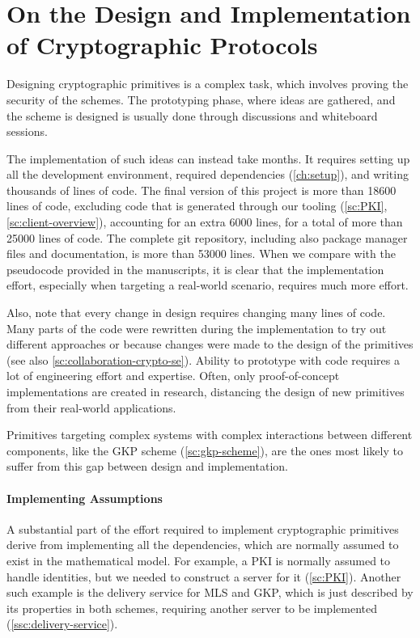 \section{On the Design and Implementation of Cryptographic Protocols}\label{sc:gap-crypto-primitives-design-implementation}

Designing cryptographic primitives is a complex task,
which involves proving the security of the schemes. 
The prototyping phase, where ideas are gathered, 
and the scheme is designed is usually done through 
discussions and whiteboard sessions.

The implementation of such ideas can instead take months.
It requires setting up all the development environment,
required dependencies (\cref{ch:setup}), and writing thousands of lines of code.
The final version of this project 
is more than 18600 lines of code, excluding code that
is generated through our tooling (\cref{sc:PKI}, \cref{sc:client-overview}), 
accounting for an extra 6000 lines,
for a total of more than 25000 lines of code.
The complete git repository, including
also package manager files and documentation, 
is more than 53000 lines.
When we compare with the pseudocode provided in the manuscripts,
it is clear that the implementation effort, especially
when targeting a real-world scenario, requires much
more effort. 

Also, note that every change in design requires
changing many lines of code. Many parts of the code
were rewritten during the implementation to try out
different approaches or because changes were made to the
design of the primitives (see also \cref{sc:collaboration-crypto-se}). 
Ability to prototype with
code requires a lot of engineering effort and
expertise. Often, only proof-of-concept
implementations are created in research,
distancing the design of new primitives from their
real-world applications.

Primitives targeting complex systems with complex interactions
between different components, like the GKP scheme (\cref{sc:gkp-scheme}), are the
ones most likely to suffer from this gap between design
and implementation.

\paragraph{Implementing Assumptions}
A substantial part of the effort required to implement
cryptographic primitives derive from implementing 
all the dependencies, which are normally assumed to exist
in the mathematical model. For example, a PKI is normally
assumed to handle identities, but we needed to construct a server for it (\cref{sc:PKI}).
Another such example is the delivery service for MLS and
GKP, which is just described by its properties in both schemes,
requiring another server to be implemented (\cref{ssc:delivery-service}).

